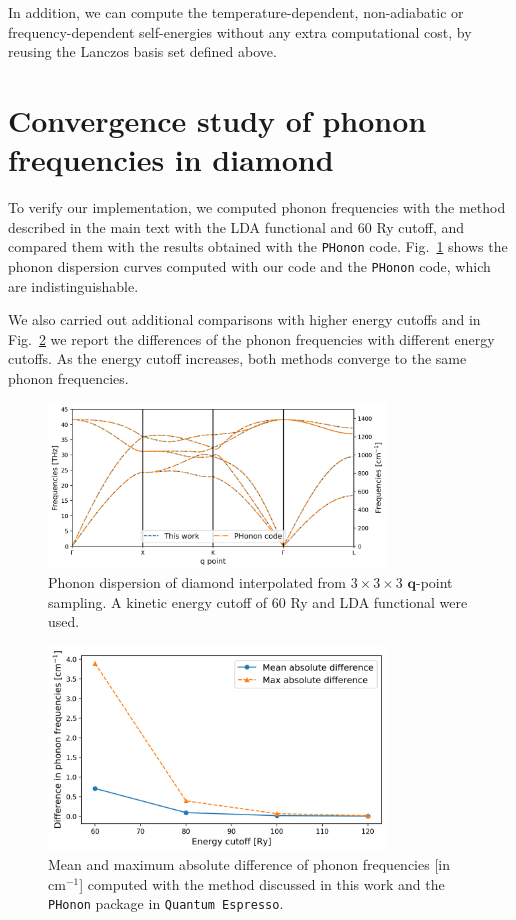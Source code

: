 \documentclass[journal=jctc,manuscript=article,preprint]{achemso}
\newcommand{\bfq}{{\mathbf{q}}}
\begin{document}
In addition, we can compute the temperature-dependent, non-adiabatic or frequency-dependent self-energies without any extra computational cost, by reusing the Lanczos basis set defined above. 


\section{Convergence study of phonon frequencies in diamond}

To verify our implementation, we computed phonon frequencies with the method described in the main text with the LDA functional and 60 Ry cutoff, and compared them with the results obtained with the \texttt{PHonon}\cite{giannozzi2009quantum} code.
Fig.~\ref{fig:diamond_dispersion} shows the phonon dispersion curves computed with our code and the \texttt{PHonon} code, which are indistinguishable.

We also carried out additional  comparisons with higher energy cutoffs and in Fig.~\ref{fig:phonon_differences} we report the differences of the phonon frequencies with different energy cutoffs. As the energy cutoff increases, both methods converge to the same phonon frequencies. 
\begin{figure}
    \centering
    \includegraphics[width=0.8\textwidth]{fig/Diamond_phonon_dispersion_60Ry.png}
    \caption{Phonon dispersion of diamond interpolated from $3\times3\times3$ $\bfq$-point sampling. A kinetic energy cutoff of 60 Ry and LDA functional were used. }
    \label{fig:diamond_dispersion}
\end{figure}

\begin{figure}
    \centering
    \includegraphics[width=0.8\textwidth]{fig/Diamond_phonon_differences.png}
    \caption{Mean and maximum absolute difference of phonon frequencies [in $\mathrm{cm}^{-1}$] computed with the method discussed in this work and the \texttt{PHonon} package in \texttt{Quantum Espresso}.}
    \label{fig:phonon_differences}
\end{figure}
\end{document}
